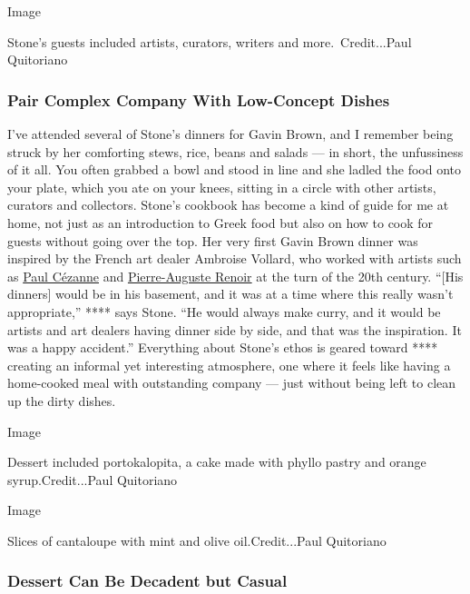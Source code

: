 Image

Stone's guests included artists, curators, writers and
more.~Credit...Paul Quitoriano

\hypertarget{pair-complex-company-with-low-concept-dishes}{%
\subsubsection{Pair Complex Company With Low-Concept
Dishes}\label{pair-complex-company-with-low-concept-dishes}}

I've attended several of Stone's dinners for Gavin Brown, and I remember
being struck by her comforting stews, rice, beans and salads --- in
short, the unfussiness of it all. You often grabbed a bowl and stood in
line and she ladled the food onto your plate, which you ate on your
knees, sitting in a circle with other artists, curators and collectors.
Stone's cookbook has become a kind of guide for me at home, not just as
an introduction to Greek food but also on how to cook for guests without
going over the top. Her very first Gavin Brown dinner was inspired by
the French art dealer Ambroise Vollard, who worked with artists such as
\href{https://www.nytimes3xbfgragh.onion/topic/person/paul-cezanne}{Paul
Cézanne} and
\href{https://www.nytimes3xbfgragh.onion/topic/person/pierre-auguste-renoir}{Pierre-Auguste
Renoir} at the turn of the 20th century. ``{[}His dinners{]} would be in
his basement, and it was at a time where this really wasn't
appropriate,'' **** says Stone. ``He would always make curry, and it
would be artists and art dealers having dinner side by side, and that
was the inspiration. It was a happy accident.'' Everything about Stone's
ethos is geared toward **** creating an informal yet interesting
atmosphere, one where it feels like having a home-cooked meal with
outstanding company --- just without being left to clean up the dirty
dishes.

Image

Dessert included portokalopita, a cake made with phyllo pastry and
orange syrup.Credit...Paul Quitoriano

Image

Slices of cantaloupe with mint and olive oil.Credit...Paul Quitoriano

\hypertarget{dessert-can-be-decadent-but-casual-}{%
\subsubsection{Dessert Can Be Decadent but Casual
}\label{dessert-can-be-decadent-but-casual-}}

